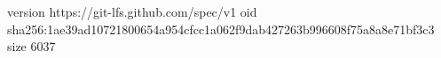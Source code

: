 version https://git-lfs.github.com/spec/v1
oid sha256:1ae39ad10721800654a954cfcc1a062f9dab427263b996608f75a8a8e71bf3c3
size 6037
